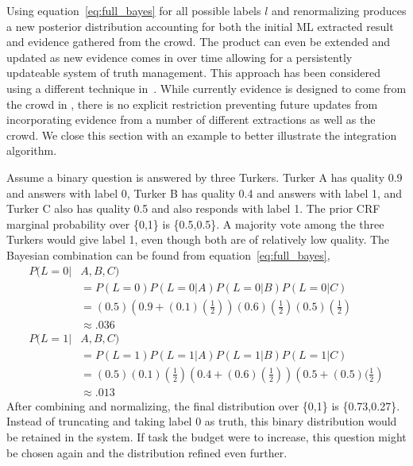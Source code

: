 Using equation~\ref{eq:full_bayes} for all possible labels $l$ and renormalizing produces a new posterior distribution accounting for both the initial ML extracted result and evidence gathered from the crowd.  The product can even be extended and updated as new evidence comes in over time allowing for a persistently updateable system of truth management.  This approach has been considered using a different technique in~\cite{Sheng:2008:GLI:1401890.1401965}.  While currently evidence is designed to come from the crowd in \sysName , there is no explicit restriction preventing future updates from incorporating evidence from a number of different extractions as well as the crowd.  We close this section with an example to better illustrate the integration algorithm.

\begin{example}
\label{ex:bayes}
Assume a binary question is answered by three Turkers.  Turker A has quality 0.9 and answers with label 0, Turker B has quality 0.4 and answers with label 1, and Turker C also has quality 0.5 and also responds with label 1.  The prior CRF marginal probability over \{0,1\} is \{0.5,0.5\}.  A majority vote among the three Turkers would give label 1, even though both are of relatively low quality.  The Bayesian combination can be found from equation~\ref{eq:full_bayes}, 
\begin{align}
P(L=0|&A,B,C) \nonumber\\
&= P(L=0)P(L=0|A)P(L=0|B)P(L=0|C)\nonumber\\
	        &= (0.5)\left(0.9 + (0.1)(\frac{1}{2})\right)(0.6)(\frac{1}{2})(0.5)(\frac{1}{2})\nonumber\\
	        &\approx .036\\
P(L=1|&A,B,C) \nonumber\\
&= P(L=1)P(L=1|A)P(L=1|B)P(L=1|C)\nonumber\\
	        &= (0.5)(0.1)(\frac{1}{2})\left(0.4 + (0.6)(\frac{1}{2})\right)\left(0.5 + (0.5)(\frac{1}{2}\right)\nonumber\\
	        &\approx .013
\end{align}
After combining and normalizing, the final distribution over \{0,1\} is \{0.73,0.27\}.  Instead of truncating and taking label 0 as truth, this binary distribution would be retained in the system.  If task the budget were to increase, this question might be chosen again and the distribution refined even further.
\end{example}

